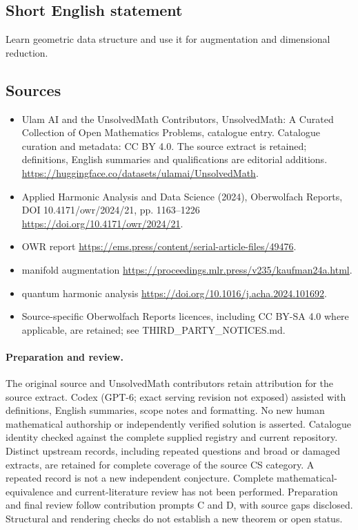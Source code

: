 \documentclass[11pt]{article}
\begin{document}
\subsection{Short English statement}
Learn geometric data structure and use it for augmentation and dimensional reduction.
\subsection{Sources}
\begin{itemize}
\item[\hypertarget{source:statement:1}{S1}] Ulam AI and the UnsolvedMath Contributors, UnsolvedMath: A Curated Collection of Open Mathematics Problems, catalogue entry. Catalogue curation and metadata: CC BY 4.0. The source extract is retained; definitions, English summaries and qualifications are editorial additions.
\url{https://huggingface.co/datasets/ulamai/UnsolvedMath}.
\item[\hypertarget{source:statement:2}{S2}] Applied Harmonic Analysis and Data Science (2024), Oberwolfach Reports, DOI 10.4171/owr/2024/21, pp. 1163--1226
\url{https://doi.org/10.4171/owr/2024/21}.
\item[\hypertarget{source:statement:3}{S3}] OWR report
\url{https://ems.press/content/serial-article-files/49476}.
\item[\hypertarget{source:statement:4}{S4}] manifold augmentation
\url{https://proceedings.mlr.press/v235/kaufman24a.html}.
\item[\hypertarget{source:statement:5}{S5}] quantum harmonic analysis
\url{https://doi.org/10.1016/j.acha.2024.101692}.
\item Source-specific Oberwolfach Reports licences, including CC BY-SA 4.0 where applicable, are retained; see THIRD\_PARTY\_NOTICES.md.
\end{itemize}
\paragraph{Preparation and review.}
The original source and UnsolvedMath contributors retain attribution for the source extract. Codex (GPT-6; exact serving revision not exposed) assisted with definitions, English summaries, scope notes and formatting. No new human mathematical authorship or independently verified solution is asserted. Catalogue identity checked against the complete supplied registry and current repository. Distinct upstream records, including repeated questions and broad or damaged extracts, are retained for complete coverage of the source CS category. A repeated record is not a new independent conjecture. Complete mathematical-equivalence and current-literature review has not been performed. Preparation and final review follow contribution prompts C and D, with source gaps disclosed. Structural and rendering checks do not establish a new theorem or open status.
\label{end:statement}
\end{document}

